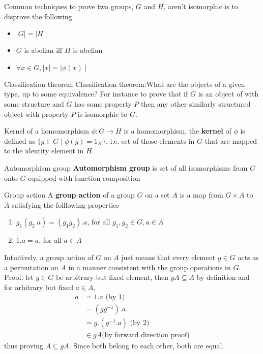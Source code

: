 \documentclass[titlepage, 12pt]{book}
\begin{document}
Common techniques to prove two groups, $G$ and $H$, aren't isomorphic is to
disprove the following

\begin{itemize}

    \item $\mid G\mid = \mid H\mid$
        
    \item $G$ is abelian iff $H$ is abelian

    \item $\forall x\in G, \mid x\mid = \mid\phi(x)\mid$
\end{itemize}

\begin{definition}{Classification theorem}{}
{Classification theorem}:What are the objects of a given type, up to some
equivalence? For instance to prove that if $G$ is an object of with some
structure and $G$ has some property $P$ then any other similarly structured
object with property $P$ is isomorphic to $G$.
\end{definition}

\begin{definition}{Kernel of a homomorphism}{}
$\phi:G\rightarrow H$ is a homomorphism, the \textbf{kernel} of $\phi$ is
defined as $\{g\in G\mid\phi(g) = 1_H\}$, i.e. set of those elements in $G$ that
are mapped to the identity element in $H$.
\end{definition}

\begin{definition}{Automorphism group}{}
\textbf{Automorphism group} is set of all isomorphisms from $G$ onto $G$
equipped with function composition
\end{definition}

\begin{definition}{Group action}{}
A \textbf{group action} of a group $G$ on a set $A$ is a
map from $G\times A$ to $A$ satisfying the folllowing properties
\begin{enumerate}

    \item $g_1(g_2.a) = (g_1g_2).a$, for all $g_1, g_2\in G, a\in A$

    \item $1.a = a$, for all $a\in A$

\end{enumerate}
\end{definition}

Intuitively, a group action of $G$ on $A$ just means that every element $g\in G$
acts as a permutation on $A$ in a manner consistent with the group operations in
$G$. Proof: let $g\in G$ be arbitrary but fixed element, then $gA\subseteq
A$ by definition and for arbitrary but fixed $a\in A$,
\begin{align*}
    a &= 1 . a \textrm{ (by 1)}\\
      &= (gg^{-1}) . a\\
      &= g . (g^{-1} . a) \textrm{ (by 2)}\\
      &\in gA  \textrm{(by forward direction proof)}
\end{align*}
thus proving $A\subseteq gA$. Since both belong to each other, both are equal.
\end{document}
